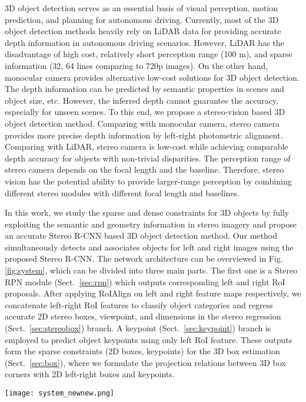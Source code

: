 \documentclass[10pt,twocolumn,letterpaper]{article}
\begin{document}
	3D object detection serves as an essential basis of visual perception, motion prediction, and planning for autonomous driving. Currently, most of the 3D object detection methods \cite{chen2017multi,qi2017frustum,zhou2017voxelnet,ku2017joint,liang2018deep} heavily rely on LiDAR data for providing accurate depth information in autonomous driving scenarios. 
However, LiDAR has the disadvantage of high cost, relatively short perception range (100 m), and sparse information (32, 64 lines comparing to 720p images). On the other hand, monocular camera provides alternative low-cost solutions\cite{chen2016monocular,mousavian20173d,cvpr18xu} for 3D object detection. The depth information can be predicted by semantic properties in scenes and object size, etc. However, the inferred depth cannot guarantee the accuracy, especially for unseen scenes. To this end, we propose a stereo-vision based 3D object detection method. Comparing with monocular camera, stereo camera provides more precise depth information by left-right photometric alignment. Comparing with LiDAR, stereo camera is low-cost while achieving comparable depth accuracy for objects with non-trivial disparities. The perception range of stereo camera depends on the focal length and the baseline. Therefore, stereo vision has the potential ability to provide larger-range perception by combining different stereo modules with different focal length and baselines.
	
	In this work, we study the sparse and dense constraints for 3D objects by fully exploiting the semantic and geometry information in stereo imagery and propose an accurate Stereo R-CNN based 3D object detection method.
	Our method simultaneously detects and associates objects for left and right images using the proposed Stereo R-CNN. 
	The network architecture can be overviewed in Fig.\ref{fig:system}, which can be divided into three main parts. The first one is a Stereo RPN module (Sect.~\ref{sec:rpn}) which outputs corresponding left and right RoI proposals. 
	After applying RoIAlign \cite{he2017mask} on left and right feature maps respectively, we concatenate left-right RoI features to classify object categories and regress accurate 2D stereo boxes, viewpoint, and dimensions in the stereo regression (Sect.~\ref{sec:stereobox}) branch.
	A keypoint (Sect.~\ref{sec:keypoint}) branch is employed to predict object keypoints using only left RoI feature. 
	These outputs form the sparse constraints (2D boxes, keypoints) for the 3D box estimation (Sect.~\ref{sec:box}), where we formulate the projection relations between 3D box corners with 2D left-right boxes and keypoints. 
	\begin{figure*}
		\begin{center}
			\texttt{[image: system\_newnew.png]}
		\end{center}
		\vspace{-0.2cm}
		\caption{Network architecture of the proposed Stereo R-CNN (Sect.~\ref{sec:rcnn}) which outputs stereo boxes, keypoints, dimensions, and the viewpoint angle, followed by the 3D box estimation (Sect.~\ref{sec:box}) and the dense 3D box alignment module (Sect.~\ref{sec:dense}).}
		\label{fig:system}
	\end{figure*}
	
\end{document}
